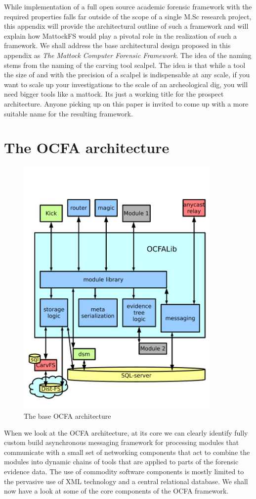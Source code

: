 While implementation of a full open source academic forensic framework with the required properties falls far outside of the scope of a single M.Sc research project, this appendix will provide the architectural outline of such a framework and will explain how MattockFS would play a pivotal role in the realization of such a framework. We shall address the base architectural design proposed in this appendix as \emph{The Mattock Computer Forensic Framework}. The idea of the naming stems from the naming of the carving tool scalpel. The idea is that while a tool the size of and with the precision of a scalpel is indispensable at any scale, if you want to scale up your investigations to the scale of an archeological dig, you will need bigger tools like a mattock. Its just a working title for the prospect architecture. Anyone picking up on this paper is invited to come up with a more suitable name for the resulting framework. 
\section{The OCFA architecture}
\begin{figure}
\centering
\includegraphics[width=100mm]{mattock/libraryview.pdf}
\caption{The base OCFA architecture}
\label{fig:FlowInOut}
\end{figure}
When we look at the OCFA architecture, at its core we can clearly identify fully custom build asynchronous messaging framework for processing modules that communicate with a small set of networking components that act to combine the modules into dynamic chains of tools that are applied to parts of the forensic evidence data. The use of commodity software components is mostly limited to the pervasive use of XML technology and a central relational database. We shall now have a look at some of the core components of the OCFA framework.
